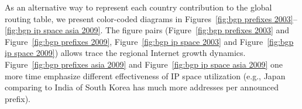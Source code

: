 As an alternative way to represent each country contribution to the global
routing table, we present color-coded diagrams in Figures~\ref{fig:bgp
prefixes 2003}--\ref{fig:bgp ip space asia 2009}. The figure pairs
(Figure~\ref{fig:bgp prefixes 2003} and Figure~\ref{fig:bgp prefixes 2009},
Figure~\ref{fig:bgp ip space 2003} and Figure~\ref{fig:bgp ip space 2009})
allows trace the regional Internet growth dynamics. Figure~\ref{fig:bgp
prefixes asia 2009} and Figure~\ref{fig:bgp ip space asia 2009} one more time
emphasize different effectiveness of IP space utilization (e.g., Japan
comparing to India of South Korea has much more addresses per announced
prefix).



